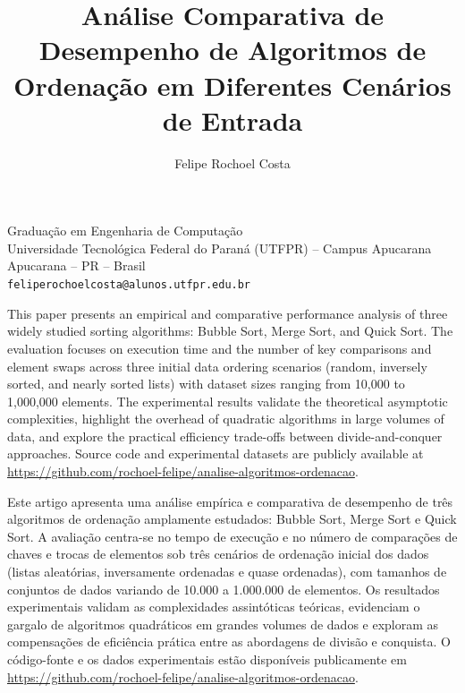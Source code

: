 \documentclass[12pt]{article}
\title{\bfseries Análise Comparativa de Desempenho de Algoritmos de Ordenação
       em Diferentes Cenários de Entrada}
\author{Felipe Rochoel Costa}
\date{}
\renewenvironment{abstract}{
  \small
  \begin{list}{}{
    \setlength{\leftmargin}{0.8cm}
    \setlength{\rightmargin}{0.8cm}
  }
  \item[\hskip \labelsep {\bfseries Abstract.}]
}{
  \end{list}
}
\newenvironment{resumo}{
  \small
  \begin{list}{}{
    \setlength{\leftmargin}{0.8cm}
    \setlength{\rightmargin}{0.8cm}
  }
  \item[\hskip \labelsep {\bfseries Resumo.}]
}{
  \end{list}
}
\begin{document}
\maketitle

\begin{center}
  \small
  Graduação em Engenharia de Computação \\
  Universidade Tecnológica Federal do Paraná (UTFPR) -- Campus Apucarana\\
  Apucarana -- PR -- Brasil \\
  \texttt{feliperochoelcosta@alunos.utfpr.edu.br}
\end{center}

\vspace{0.5cm}

\begin{abstract}
  This paper presents an empirical and comparative performance analysis of
  three widely studied sorting algorithms: Bubble Sort, Merge Sort, and
  Quick Sort. The evaluation focuses on execution time and the number of key
  comparisons and element swaps across three initial data ordering scenarios
  (random, inversely sorted, and nearly sorted lists) with dataset sizes
  ranging from 10{,}000 to 1{,}000{,}000 elements. The experimental results
  validate the theoretical asymptotic complexities, highlight the overhead of
  quadratic algorithms in large volumes of data, and explore the practical
  efficiency trade-offs between divide-and-conquer approaches. Source code
  and experimental datasets are publicly available at
  \url{https://github.com/rochoel-felipe/analise-algoritmos-ordenacao}.
\end{abstract}

\begin{resumo}
  Este artigo apresenta uma análise empírica e comparativa de desempenho de
  três algoritmos de ordenação amplamente estudados: Bubble Sort, Merge Sort
  e Quick Sort. A avaliação centra-se no tempo de execução e no número de
  comparações de chaves e trocas de elementos sob três cenários de ordenação
  inicial dos dados (listas aleatórias, inversamente ordenadas e quase
  ordenadas), com tamanhos de conjuntos de dados variando de 10.000 a
  1.000.000 de elementos. Os resultados experimentais validam as
  complexidades assintóticas teóricas, evidenciam o gargalo de algoritmos
  quadráticos em grandes volumes de dados e exploram as compensações de
  eficiência prática entre as abordagens de divisão e conquista. O
  código-fonte e os dados experimentais estão disponíveis publicamente em
  \url{https://github.com/rochoel-felipe/analise-algoritmos-ordenacao}.
\end{resumo}
\end{document}
